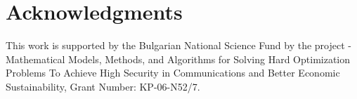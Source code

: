 \newpage
{}
\chapter*{Acknowledgments}

This work is supported by the Bulgarian National Science Fund by the project - Mathematical Models, Methods, and Algorithms for Solving Hard Optimization Problems To Achieve High Security in Communications and Better Economic Sustainability, Grant Number: KP-06-N52/7.
